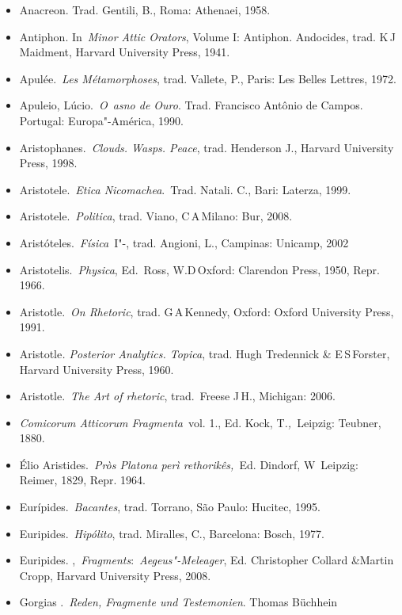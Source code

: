 \begin{itemize}
\itemsep1pt\parskip0pt
\item
  Anacreon. Trad. Gentili, B., Roma: Athenaei, 1958.
\item
  Antiphon. In~\emph{Minor Attic Orators}, Volume I: Antiphon.
  Andocides, trad. K\,J\,Maidment, Harvard University Press, 1941.
\item
  Apulée.~\emph{Les Métamorphoses}, trad. Vallete, P., Paris: Les Belles
  Lettres, 1972.
\item
  Apuleio, Lúcio.~\emph{O~asno de Ouro}. Trad. Francisco Antônio de
  Campos. Portugal: Europa"-América, 1990.
\item
  Aristophanes.~\emph{Clouds. Wasps. Peace}, trad. Henderson J., Harvard
  University Press, 1998.
\item
  Aristotele.~\emph{Etica Nicomachea}.~Trad. Natali. C., Bari: Laterza,
  1999.
\item
  Aristotele.~\emph{Politica}, trad. Viano, C\,A\,Milano: Bur, 2008.
\item
  Aristóteles.~\emph{Física}~I"-, trad. Angioni, L., Campinas: Unicamp,
  2002
\item
  Aristotelis.~\emph{Physica}, Ed.~Ross, W.D\,Oxford: Clarendon Press,
  1950, Repr. 1966.
\item
  Aristotle.~\emph{On Rhetoric}, trad. G\,A\,Kennedy, Oxford: Oxford
  University Press, 1991.
\item
  Aristotle\emph{. Posterior Analytics. Topica}, trad. Hugh Tredennick
  \& E\,S\,Forster, Harvard University Press, 1960.
\item
  Aristotle.~\emph{The Art of rhetoric}, trad.~Freese J\,H., Michigan:
  2006.
\item
  \emph{Comicorum Atticorum Fragmenta}~vol. 1., Ed. Kock,
  T\emph{.,~}Leipzig: Teubner, 1880.
\item
  Élio Aristides.~\emph{Pròs Platona perì rethorikês,~}Ed. Dindorf, W\,  Leipzig: Reimer, 1829, Repr. 1964.
\item
  Eurípides.~\emph{Bacantes}, trad.  Torrano, São Paulo: Hucitec,
  1995.
\item
  Euripides.~\emph{Hipólito}, trad. Miralles, C., Barcelona: Bosch,
  1977.
\item
  Euripides. ,~\emph{Fragments}:~\emph{Aegeus"-Meleager}, Ed.
  Christopher Collard \&Martin Cropp, Harvard University Press, 2008.
\item
  Gorgias .~\emph{Reden, Fragmente und Testemonien}. Thomas Büchhein

\end{itemize}
